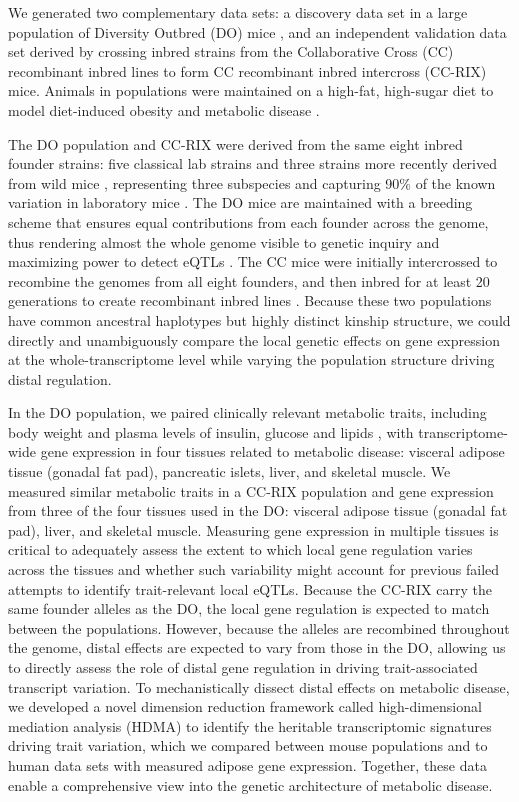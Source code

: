 \documentclass[
]{article}
\begin{document}
We generated two complementary data sets: a discovery data set in a
large population of Diversity Outbred (DO) mice \cite{pmid22892839}, and
an independent validation data set derived by crossing inbred strains
from the Collaborative Cross (CC) recombinant inbred lines
\cite{pmid18716833} to form CC recombinant inbred intercross (CC-RIX)
mice. Animals in populations were maintained on a high-fat, high-sugar
diet to model diet-induced obesity and metabolic disease
\cite{pmid29567659}.

The DO population and CC-RIX were derived from the same eight inbred
founder strains: five classical lab strains and three strains more
recently derived from wild mice \cite{pmid22892839}, representing three
subspecies and capturing 90\% of the known variation in laboratory mice
\cite{pmid31133439}. The DO mice are maintained with a breeding scheme
that ensures equal contributions from each founder across the genome,
thus rendering almost the whole genome visible to genetic inquiry and
maximizing power to detect eQTLs \cite{pmid22892839}. The CC mice were
initially intercrossed to recombine the genomes from all eight founders,
and then inbred for at least 20 generations to create recombinant inbred
lines \cite{pmid18716833, pmid21411855, 
pmid31133439}. Because these two populations have common ancestral
haplotypes but highly distinct kinship structure, we could directly and
unambiguously compare the local genetic effects on gene expression at
the whole-transcriptome level while varying the population structure
driving distal regulation.

In the DO population, we paired clinically relevant metabolic traits,
including body weight and plasma levels of insulin, glucose and lipids
\cite{pmid29567659}, with transcriptome-wide gene expression in four
tissues related to metabolic disease: visceral adipose tissue (gonadal
fat pad), pancreatic islets, liver, and skeletal muscle. We measured
similar metabolic traits in a CC-RIX population and gene expression from
three of the four tissues used in the DO: visceral adipose tissue
(gonadal fat pad), liver, and skeletal muscle. Measuring gene expression
in multiple tissues is critical to adequately assess the extent to which
local gene regulation varies across the tissues and whether such
variability might account for previous failed attempts to identify
trait-relevant local eQTLs. Because the CC-RIX carry the same founder
alleles as the DO, the local gene regulation is expected to match
between the populations. However, because the alleles are recombined
throughout the genome, distal effects are expected to vary from those in
the DO, allowing us to directly assess the role of distal gene
regulation in driving trait-associated transcript variation. To
mechanistically dissect distal effects on metabolic disease, we
developed a novel dimension reduction framework called high-dimensional
mediation analysis (HDMA) to identify the heritable transcriptomic
signatures driving trait variation, which we compared between mouse
populations and to human data sets with measured adipose gene
expression. Together, these data enable a comprehensive view into the
genetic architecture of metabolic disease.
\end{document}
